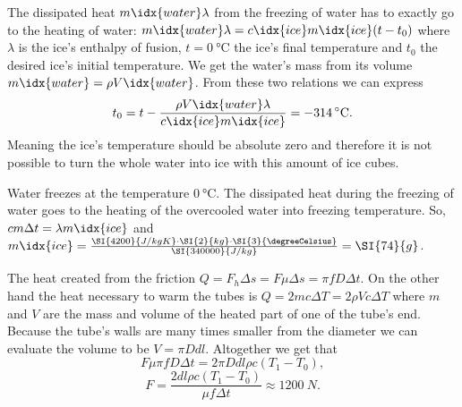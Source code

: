 \documentclass[11pt]{article}
\begin{document}

\solueng
The dissipated heat $m\idx{water} \lambda$ from the freezing of water has to exactly go to the heating of water: $m\idx{water} \lambda = c\idx{ice} m\idx{ice} (t - t_0)$ where $\lambda$ is the ice’s enthalpy of fusion, $t=\SI{0}{\degreeCelsius}$ the ice’s final temperature and $t_0$ the desired ice’s initial temperature. We get the water’s mass from its volume $m\idx{water} = \rho V\idx{water}$. From these two relations we can express
$$t_0 = t - \frac{\rho V\idx{water} \lambda}{c\idx{ice} m\idx{ice}} = -314 \,^{\circ}{\rm C}.$$
Meaning the ice’s temperature should be absolute zero and therefore it is not possible to turn the whole water into ice with this amount of ice cubes.
\probend
\bigskip


\solueng
Water freezes at the temperature $\SI{0}{\degreeCelsius}$. The dissipated heat during the freezing of water goes to the heating of the overcooled water into freezing temperature. So, $cm\Delta t = \lambda m\idx{ice}$ and $m\idx{ice}=\frac{\SI{4200}{J / kg K} \cdot \SI{2}{kg} \cdot \SI{3}{\degreeCelsius}}{\SI{340000}{J / kg}}=\SI{74}{g}$.
\probend
\bigskip


\solueng
The heat created from the friction $Q = F_h \Delta s = F \mu \Delta s = \pi f D \Delta t$. On the other hand the heat necessary to warm the tubes is $Q = 2 m c \Delta T = 2 \rho V c \Delta T$ where $m$ and $V$ are the mass and volume of the heated part of one of the tube’s end. Because the tube's walls are many times smaller from the diameter we can evaluate the volume to be $V = \pi D d l$. Altogether we get that
\[
F \mu \pi f D \Delta t = 2 \pi D d l \rho c ( T_1 - T_0 ),
\]
\[
F = \frac{2 d l \rho c ( T_1 - T_0 )}{ \mu f \Delta t } \approx \SI{1200}{N}.
\]
\probend
\bigskip

\end{document}
